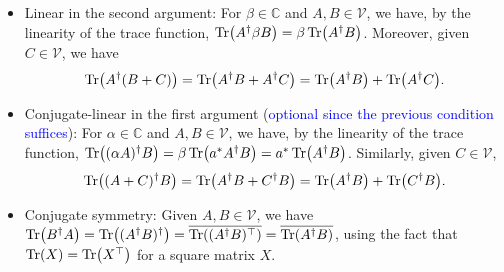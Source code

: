 \documentclass{article}
\theoremstyle{definition}
\newcommand{\al}{\alpha}
\newcommand{\be}{\beta}
\begin{document}
\begin{enumerate}[label = (\alph*)]
\begin{itemize}
		
		\item Linear in the second argument: For $\be \in \mathbb{C}$ and $A,B\in \mathcal{V}$, we have, by the linearity of the trace function, $\Tr(A^\dagger \be B) =  \be \Tr(A^\dagger B)$. Moreover, given $C\in \mathcal{V}$, we have
		\begin{align*}
		\Tr(A^\dagger (B+C)) = \Tr(A^\dagger B + A^\dagger C) = \Tr(A^\dagger B) + \Tr(A^\dagger C). 
		\end{align*}
	
		\item Conjugate-linear in the first argument (\textcolor{blue}{optional since the previous condition suffices}): For $\al \in \mathbb{C}$ and $A,B\in \mathcal{V}$, we have, by the linearity of the trace function, $\Tr((\al A)^\dagger B) =  \be \Tr(a^* A^\dagger B) = a^* \Tr(A^\dagger B)$. Similarly, given $C\in \mathcal{V}$, 
		\begin{align*}
		\Tr((A+C)^\dagger B) = \Tr(A^\dagger B + C^\dagger B) = \Tr(A^\dagger B) + \Tr(C^\dagger B). 
		\end{align*}
		
		\item Conjugate symmetry: Given $A,B\in \mathcal{V}$, we have $\Tr(B^\dagger A)= \Tr((A^\dagger B)^\dagger) = \overline{\Tr((A^\dagger B)^\top)} = \overline{\Tr(A^\dagger B)}$, using the fact that $\Tr(X) = \Tr(X^\top)$ for a square matrix $X$. 
		
	\end{itemize}






\end{enumerate}
\end{document}
